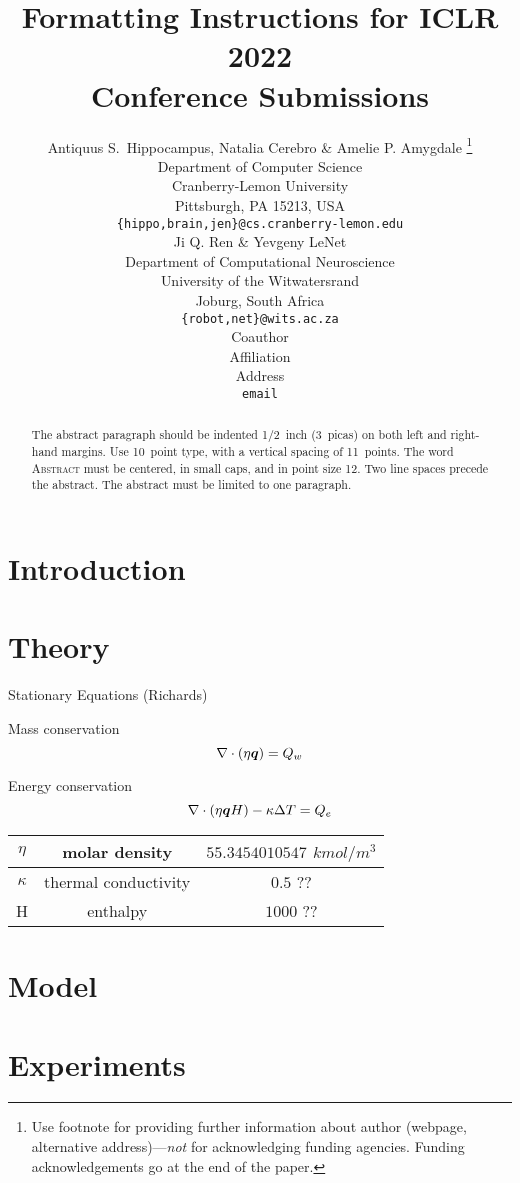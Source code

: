 \documentclass{article} %
\title{Formatting Instructions for ICLR 2022 \\ Conference Submissions}
\author{Antiquus S.~Hippocampus, Natalia Cerebro \& Amelie P. Amygdale \thanks{ Use footnote for providing further information
about author (webpage, alternative address)---\emph{not} for acknowledging
funding agencies.  Funding acknowledgements go at the end of the paper.} \\
Department of Computer Science\\
Cranberry-Lemon University\\
Pittsburgh, PA 15213, USA \\
\texttt{\{hippo,brain,jen\}@cs.cranberry-lemon.edu} \\
\And
Ji Q. Ren \& Yevgeny LeNet \\
Department of Computational Neuroscience \\
University of the Witwatersrand \\
Joburg, South Africa \\
\texttt{\{robot,net\}@wits.ac.za} \\
\AND
Coauthor \\
Affiliation \\
Address \\
\texttt{email}
}
\begin{document}
\maketitle

\begin{abstract}
   The abstract paragraph should be indented 1/2~inch (3~picas) on both left and
   right-hand margins. Use 10~point type, with a vertical spacing of 11~points.
   The word \textsc{Abstract} must be centered, in small caps, and in point size 12. Two
   line spaces precede the abstract. The abstract must be limited to one
   paragraph.
\end{abstract}

\section{Introduction}

\section{Theory}

Stationary Equations (Richards)

Mass conservation
\begin{equation}
   \nabla \cdot \left(\eta {\bm{q}} \right) = Q_w
\end{equation}

Energy conservation
\begin{equation}
   \nabla \cdot \left(\eta {\bm{q}} H\right) - \kappa \Delta T = Q_e
\end{equation}

\begin{tabular}{| c | c | c |}
   \hline
   $\eta$   & molar density        & $55.3454010547$ $kmol/m^3$ \\
   \hline
   $\kappa$ & thermal conductivity & $0.5$ ??                   \\
   \hline
   H        & enthalpy             & $1000$ ??                  \\
   \hline
\end{tabular}

\section{Model}

\section{Experiments}
\end{document}

